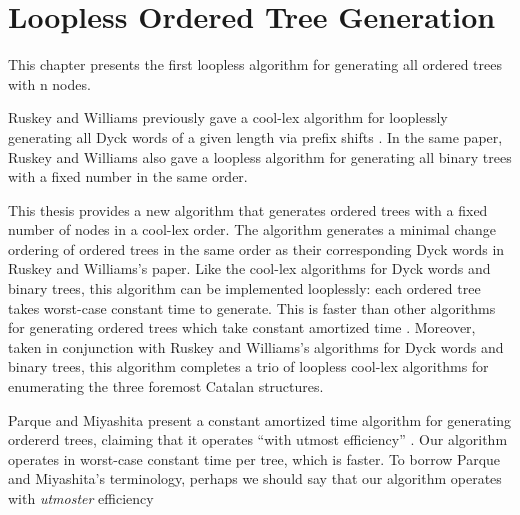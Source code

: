 \section{Loopless Ordered Tree Generation}
This chapter presents the first loopless algorithm for generating all ordered trees with n nodes. 

Ruskey and Williams previously gave a cool-lex algorithm for looplessly generating all Dyck words  of a given length via prefix shifts \cite{ruskey2008generating}.  In the same paper, Ruskey and Williams also gave a loopless algorithm for generating all binary trees with a fixed number in the same order.

This thesis provides a new algorithm that generates ordered trees with a fixed number of nodes in a cool-lex order. The algorithm generates a minimal change ordering of ordered trees in the same order as their corresponding Dyck words in Ruskey and Williams's paper. Like the cool-lex algorithms for Dyck words and binary trees, this algorithm can be implemented looplessly: each ordered tree takes worst-case constant time to generate. This is faster than other algorithms for generating ordered trees which take constant amortized time \cite{parque2021efficient} \cite{er1985lexotrees} \cite{zaks1980lexotrees} \cite{skarbek1988pointerotrees}. Moreover, taken in conjunction with Ruskey and Williams's algorithms for Dyck words and binary trees, this algorithm completes a trio of loopless cool-lex algorithms for enumerating the three foremost Catalan structures.


Parque and Miyashita present a constant amortized time algorithm for generating ordererd trees, claiming that it operates ``with utmost efficiency'' \cite{parque2021efficient}.  Our algorithm operates in worst-case constant time per tree, which is faster. To borrow Parque and Miyashita's terminology, perhaps we should say that our algorithm operates with \emph{utmoster} efficiency

